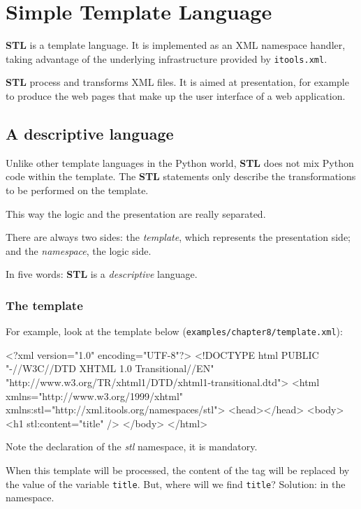 \chapter{Simple Template Language}
\label{Chapter: STL}

{\bf STL} is a template language. It is implemented as an XML namespace
handler, taking advantage of the underlying infrastructure provided by
{\tt itools.xml}.

{\bf STL} process and transforms XML files. It is aimed at presentation,
for example to produce the web pages that make up the user interface of
a web application.


\section{A descriptive language}

Unlike other template languages in the Python world, {\bf STL} does not
mix Python code within the template. The {\bf STL} statements only describe
the transformations to be performed on the template.

This way the logic and the presentation are really separated.

There are always two sides: the {\em template}, which represents the
presentation side; and the {\em namespace}, the logic side.

In five words: {\bf STL} is a {\em descriptive} language.

\subsection{The template}

For example, look at the template below ({\tt examples/chapter8/template.xml}):

\begin{code}
    <?xml version="1.0" encoding="UTF-8"?>
    <!DOCTYPE html
         PUBLIC "-//W3C//DTD XHTML 1.0 Transitional//EN"
         "http://www.w3.org/TR/xhtml1/DTD/xhtml1-transitional.dtd">
    <html xmlns="http://www.w3.org/1999/xhtml"
          xmlns:stl="http://xml.itools.org/namespaces/stl">
      <head></head>
      <body>
        <h1 stl:content="title" />
      </body>
    </html>
\end{code}

Note the declaration of the {\em stl} namespace, it is mandatory.

When this template will be processed, the content of the {\tt <h1>} tag
will be replaced by the value of the variable {\tt title}. But, where will
we find {\tt title}? Solution: in the namespace.

